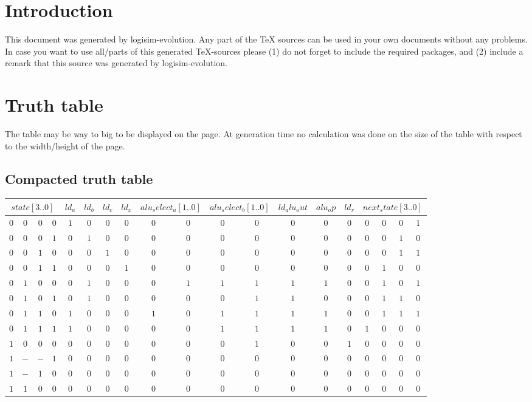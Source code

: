 \documentclass [15pt,a4paper,twoside]{article}
\begin{document}
\section{Introduction}
This document was generated by logisim-evolution. Any part of the TeX sources can be used in your own documents without any problems. In case you want to use all/parts of this generated TeX-sources please (1) do not forget to include the required packages, and (2) include a remark that this source was generated by logisim-evolution.
\section{Truth table}
The table may be way to big to be displayed on the page. At generation time no calculation was done on the size of the table with respect to the width/height of the page.
\subsection{Compacted truth table}
\begin{center}
\begin{tabular}{cccc|ccccccccccccccc}
\multicolumn{4}{c|}{$state[3..0]$}&$ld_a$&$ld_b$&$ld_c$&$ld_x$&\multicolumn{2}{c}{$alu_select_a[1..0]$}&\multicolumn{2}{c}{$alu_select_b[1..0]$}&$ld_alu_out$&$alu_op$&$ld_r$&\multicolumn{4}{c}{$next_state[3..0]$}\\
\hline
$0$&$0$&$0$&$0$&$1$&$0$&$0$&$0$&$0$&$0$&$0$&$0$&$0$&$0$&$0$&$0$&$0$&$0$&$1$\\
$0$&$0$&$0$&$1$&$0$&$1$&$0$&$0$&$0$&$0$&$0$&$0$&$0$&$0$&$0$&$0$&$0$&$1$&$0$\\
$0$&$0$&$1$&$0$&$0$&$0$&$1$&$0$&$0$&$0$&$0$&$0$&$0$&$0$&$0$&$0$&$0$&$1$&$1$\\
$0$&$0$&$1$&$1$&$0$&$0$&$0$&$1$&$0$&$0$&$0$&$0$&$0$&$0$&$0$&$0$&$1$&$0$&$0$\\
$0$&$1$&$0$&$0$&$0$&$1$&$0$&$0$&$0$&$1$&$1$&$1$&$1$&$1$&$0$&$0$&$1$&$0$&$1$\\
$0$&$1$&$0$&$1$&$0$&$1$&$0$&$0$&$0$&$0$&$0$&$1$&$1$&$0$&$0$&$0$&$1$&$1$&$0$\\
$0$&$1$&$1$&$0$&$1$&$0$&$0$&$0$&$1$&$0$&$1$&$1$&$1$&$1$&$0$&$0$&$1$&$1$&$1$\\
$0$&$1$&$1$&$1$&$1$&$0$&$0$&$0$&$0$&$0$&$1$&$1$&$1$&$1$&$0$&$1$&$0$&$0$&$0$\\
$1$&$0$&$0$&$0$&$0$&$0$&$0$&$0$&$0$&$0$&$0$&$1$&$0$&$0$&$1$&$0$&$0$&$0$&$0$\\
$1$&$-$&$-$&$1$&$0$&$0$&$0$&$0$&$0$&$0$&$0$&$0$&$0$&$0$&$0$&$0$&$0$&$0$&$0$\\
$1$&$-$&$1$&$0$&$0$&$0$&$0$&$0$&$0$&$0$&$0$&$0$&$0$&$0$&$0$&$0$&$0$&$0$&$0$\\
$1$&$1$&$0$&$0$&$0$&$0$&$0$&$0$&$0$&$0$&$0$&$0$&$0$&$0$&$0$&$0$&$0$&$0$&$0$\\

\end{tabular}
\end{center}
\end{document}
